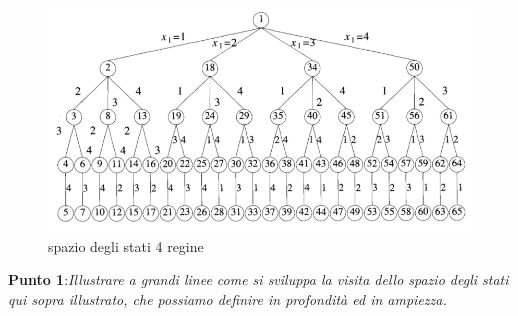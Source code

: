 \documentclass[a4paper]{article}
\begin{document}
\begin{figure}[!ht]
\centering
\includegraphics[width=1\textwidth]{./img/C_2.png}
\caption{spazio degli stati 4 regine} \label{FIG:C_2}
\end{figure}
\textbf{Punto 1}:\emph{Illustrare a grandi linee come si sviluppa la visita dello spazio degli stati qui sopra illustrato, che possiamo definire in profondità ed in ampiezza.}
\end{document}
